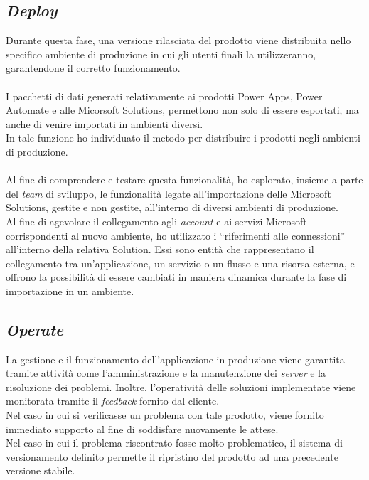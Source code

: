 \subsection{\emph{Deploy}}
Durante questa fase, una versione rilasciata del prodotto viene distribuita nello specifico ambiente di produzione in cui gli utenti finali la utilizzeranno, garantendone il corretto funzionamento.\\\\
I pacchetti di dati generati relativamente ai prodotti Power Apps, Power Automate e alle Micorsoft Solutions, permettono non solo di essere esportati, ma anche di venire importati in ambienti diversi.\\
In tale funzione ho individuato il metodo per distribuire i prodotti negli ambienti di produzione.\\\\
Al fine di comprendere e testare questa funzionalità, ho esplorato, insieme a parte del \emph{team} di sviluppo, le funzionalità legate all'importazione delle Microsoft Solutions, gestite e non gestite, all'interno di diversi ambienti di produzione.\\ 
Al fine di agevolare il collegamento agli \emph{account} e ai servizi Microsoft corrispondenti al nuovo ambiente, ho utilizzato i “riferimenti alle connessioni” all'interno della relativa Solution.
Essi sono entità che rappresentano il collegamento tra un'applicazione, un servizio o un flusso e una risorsa esterna, e offrono la possibilità di essere cambiati in maniera dinamica durante la fase di importazione in un ambiente.
    

\subsection{\emph{Operate}}
La gestione e il funzionamento dell'applicazione in produzione viene garantita tramite attività come l'amministrazione e la manutenzione dei \emph{server} e la risoluzione dei problemi. 
Inoltre, l'operatività delle soluzioni implementate viene monitorata tramite il \emph{feedback} fornito dal cliente.\\
Nel caso in cui si verificasse un problema con tale prodotto, viene fornito immediato supporto al fine di soddisfare nuovamente le attese.\\
Nel caso in cui il problema riscontrato fosse molto problematico, il sistema di versionamento definito permette il ripristino del prodotto ad una precedente versione stabile. 

